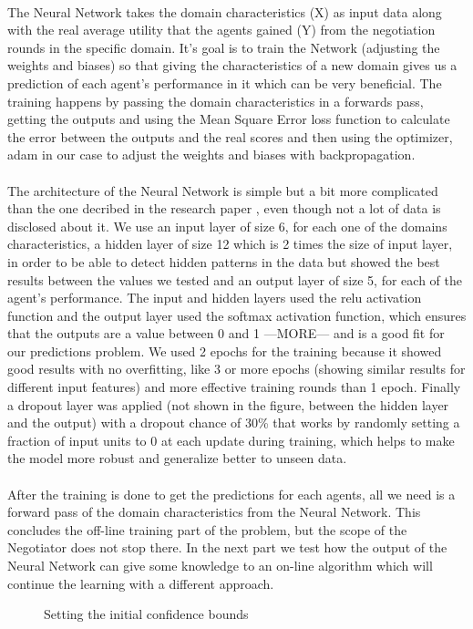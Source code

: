 \paragraph{}
 The Neural Network takes the domain characteristics (X) as input data along with the real average utility that the agents gained (Y) from the negotiation rounds in the specific domain. It’s goal is to train the Network (adjusting the weights and biases) so that giving the characteristics of a new domain gives us a prediction of each agent’s performance in it which can be very beneficial.  
 The training happens by passing the domain characteristics in a forwards pass, getting the outputs and using the Mean Square Error loss function to calculate the error between the outputs and the real scores and then using the optimizer, adam in our case to adjust the weights and biases with backpropagation.
 \paragraph{}

The architecture of the Neural Network is simple but a bit more complicated than the one decribed in the research paper \cite{meta_agent_paper}, even though not a lot of data is disclosed about it.
 We use an input layer of size 6, for each one of the domains characteristics, 
 a hidden layer of size 12 which is 2 times the size of input layer, in order to be able to detect hidden patterns in the data but showed 
 the best results between the values we tested and an output layer of size 5, for each of the agent's performance.  
 The input and hidden layers used the relu activation function and the output layer used the softmax activation function, which ensures that the outputs are a value between 0 and 1 —MORE— and is a good fit for our predictions problem. We used 2 epochs for the training because it showed good results with no overfitting, like 3 or more epochs (showing similar results for different input features) and
  more effective training rounds than 1 epoch. Finally a dropout layer was applied (not shown in the figure, between the hidden layer and the output) with a dropout chance of 30\% that works by 
  randomly setting a fraction of input units to 0 at each update during training, which helps to make the model more robust and generalize better to unseen data. 
\paragraph{}


After the training is done to get the predictions for each agents, 
all we need is a forward pass of the domain characteristics from the Neural Network. 
This concludes the off-line training part of the problem, but the scope of the Negotiator does not stop there.
In the next part we test how the output of the Neural Network can give some knowledge to an on-line algorithm 
which will continue the learning with a different approach.
\begin{figure}[H]
	\centering
	\captionsetup{justification=centering}
	\caption{Setting the initial confidence bounds}
	\label{fig:Setting the initial confidence bounds}
\end{figure}
 